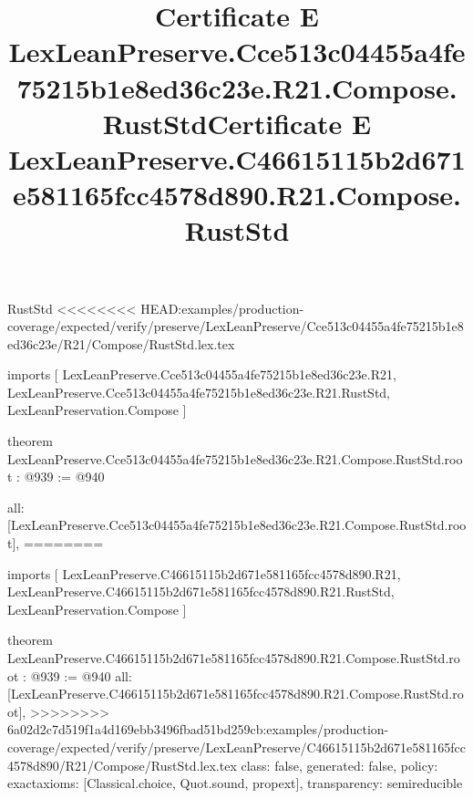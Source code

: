 \begin{lexlean}{RustStd}
<<<<<<<< HEAD:examples/production-coverage/expected/verify/preserve/LexLeanPreserve/Cce513c04455a4fe75215b1e8ed36c23e/R21/Compose/RustStd.lex.tex
\title{Certificate E LexLeanPreserve.Cce513c04455a4fe75215b1e8ed36c23e.R21.Compose.RustStd}
\begin{coremodule}
imports [
  LexLeanPreserve.Cce513c04455a4fe75215b1e8ed36c23e.R21,
  LexLeanPreserve.Cce513c04455a4fe75215b1e8ed36c23e.R21.RustStd,
  LexLeanPreservation.Compose
]

theorem LexLeanPreserve.Cce513c04455a4fe75215b1e8ed36c23e.R21.Compose.RustStd.root : @939 := @940 {
  all: [LexLeanPreserve.Cce513c04455a4fe75215b1e8ed36c23e.R21.Compose.RustStd.root],
========
\title{Certificate E LexLeanPreserve.C46615115b2d671e581165fcc4578d890.R21.Compose.RustStd}
\begin{coremodule}
imports [
  LexLeanPreserve.C46615115b2d671e581165fcc4578d890.R21,
  LexLeanPreserve.C46615115b2d671e581165fcc4578d890.R21.RustStd,
  LexLeanPreservation.Compose
]

theorem LexLeanPreserve.C46615115b2d671e581165fcc4578d890.R21.Compose.RustStd.root : @939 := @940 {
  all: [LexLeanPreserve.C46615115b2d671e581165fcc4578d890.R21.Compose.RustStd.root],
>>>>>>>> 6a02d2c7d519f1a4d169ebb3496fbad51bd259cb:examples/production-coverage/expected/verify/preserve/LexLeanPreserve/C46615115b2d671e581165fcc4578d890/R21/Compose/RustStd.lex.tex
  class: false,
  generated: false,
  policy: exact{axioms: [Classical.choice, Quot.sound, propext]},
  transparency: semireducible
}


\end{coremodule}}
\end{coremodule}
\end{lexlean}
